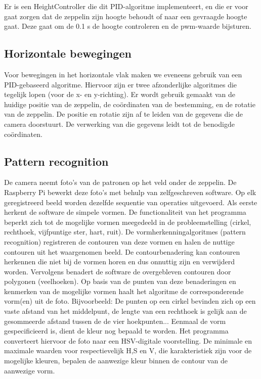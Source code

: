 \documentclass[tt]{penoverslag}
\begin{document}
Er is een HeightController die dit PID-algoritme implementeert, en die er voor gaat zorgen dat de zeppelin zijn hoogte behoudt of naar een gevraagde hoogte gaat. Deze gaat om de 0.1 s de hoogte controleren en de pwm-waarde bijsturen. \\

\subsection{Horizontale bewegingen}
Voor bewegingen in het horizontale vlak maken we eveneens gebruik van een PID-gebaseerd algoritme. Hiervoor zijn er twee afzonderlijke algoritmes die tegelijk lopen (voor de x- en y-richting). Er wordt gebruik gemaakt van de huidige positie van de zeppelin, de co\"{o}rdinaten van de bestemming, en de rotatie van de zeppelin. De positie en rotatie zijn af te leiden van de gegevens die de camera doorstuurt. De verwerking van die gegevens leidt tot de benodigde co\"{o}rdinaten.

\subsection{Pattern recognition}
De camera neemt foto’s van de patronen op het veld onder de zeppelin. De Raspberry Pi bewerkt deze foto’s met behulp van zelfgeschreven software. Op elk geregistreerd beeld worden dezelfde sequentie van operaties uitgevoerd. 
Als eerste herkent de software de simpele vormen. De functionaliteit van het programma beperkt zich tot de mogelijke vormen meegedeeld in de probleemstelling (cirkel, rechthoek, vijfpuntige ster, hart, ruit). De vormherkenningalgoritmes (pattern recognition) registreren de contouren van deze vormen en halen de nuttige contouren uit het waargenomen beeld. De contourbenadering kan contouren herkennen die niet bij de vormen horen en dus onnuttig zijn en verwijderd worden. Vervolgens benadert de software de overgebleven contouren door polygonen (veelhoeken). Op basis van de punten van deze benaderingen en kenmerken van de mogelijke vormen haalt het algoritme de corresponderende vorm(en) uit de foto. Bijvoorbeeld: De punten op een cirkel bevinden zich op een vaste afstand van het middelpunt, de lengte van een rechthoek is gelijk aan de gesommeerde afstand tussen de de vier hoekpunten... 
Eenmaal de vorm gespecificieerd is, dient de kleur nog bepaald te worden.  Het programma converteert hiervoor de foto naar een HSV-digitale voorstelling. De minimale en maximale waarden voor respectievelijk H,S en V, die karakteristiek zijn voor de mogelijke kleuren, bepalen de aanwezige kleur binnen de contour van de aanwezige vorm. 
\end{document}
